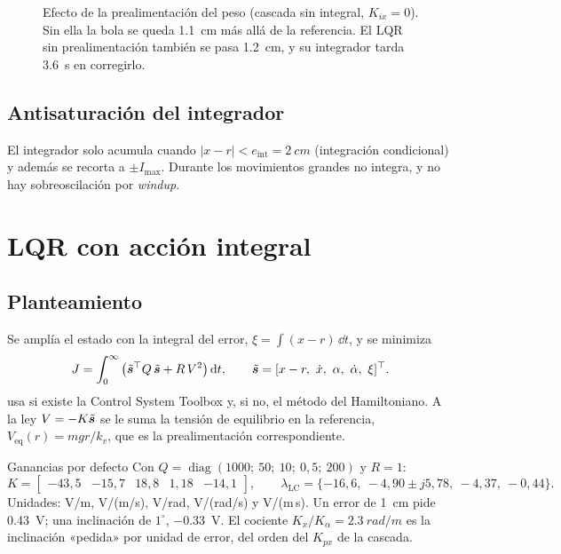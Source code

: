 \begin{figure}[H]
\centering
{}
\caption{Efecto de la prealimentación del peso (cascada sin integral, $K_{ix}=0$). Sin ella la bola se queda \SI{1.1}{cm} más allá de la referencia. El LQR sin prealimentación también se pasa \SI{1.2}{cm}, y su integrador tarda \SI{3.6}{s} en corregirlo.}
\label{fig:ff}
\end{figure}

\subsection{Antisaturación del integrador}
El integrador solo acumula cuando $|x-r|<e_{\text{int}}=\SI{2}{cm}$ (integración condicional) y además se recorta a $\pm I_{\max}$. Durante los movimientos grandes no integra, y no hay sobreoscilación por \emph{windup}.

\section{LQR con acción integral}
\label{sec:lqr}

\subsection{Planteamiento}
Se amplía el estado con la integral del error, $\xi=\int(x-r)\,\dd t$, y se minimiza
\begin{equation}
  J=\int_0^\infty\left(\tilde{\vect s}^\top Q\,\tilde{\vect s} + R\,V^2\right)\dd t,\qquad \tilde{\vect s}=[x-r,\ \xd,\ \alpha,\ \ald,\ \xi]^\top .
\end{equation}
 usa  si existe la Control System Toolbox y, si no, el método del Hamiltoniano. A la ley $V=-K\tilde{\bm{s}}$ se le suma la tensión de equilibrio en la referencia, $V_{\text{eq}}(r)=mgr/k_v$, que es la prealimentación correspondiente.

\begin{ejemplo}{Ganancias por defecto}
Con $Q=\operatorname{diag}(1000;\ 50;\ 10;\ 0{,}5;\ 200)$ y $R=1$:
\[
K=\begin{bmatrix}-43{,}5 & -15{,}7 & 18{,}8 & 1{,}18 & -14{,}1\end{bmatrix},\qquad
\lambda_{\text{LC}}=\{-16{,}6,\ -4{,}90\pm j5{,}78,\ -4{,}37,\ -0{,}44\}.
\]
Unidades: V/m, V/(m/s), V/rad, V/(rad/s) y V/(m\,s). Un error de \SI{1}{cm} pide \SI{0.43}{V}; una inclinación de $1^\circ$, \SI{-0.33}{V}. El cociente $K_x/K_\alpha=\SI{2.3}{rad/m}$ es la inclinación «pedida» por unidad de error, del orden del $K_{px}$ de la cascada.
\end{ejemplo}

